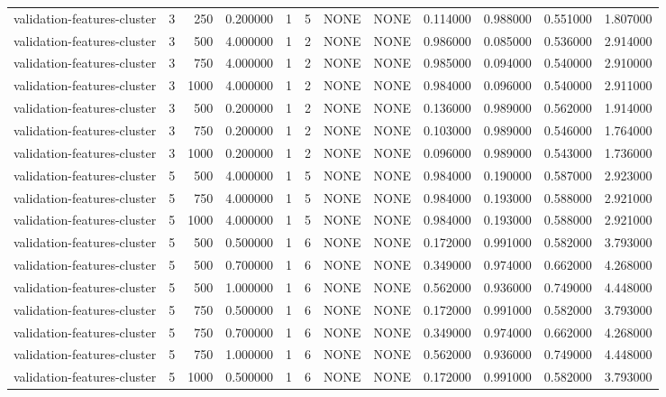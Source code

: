 \begin{tabular}{lrrrllllrrrr}
validation-features-cluster & 3 & 250 & 0.200000 & 1 & 5 & NONE & NONE & 0.114000 & 0.988000 & 0.551000 & 1.807000 \\
validation-features-cluster & 3 & 500 & 4.000000 & 1 & 2 & NONE & NONE & 0.986000 & 0.085000 & 0.536000 & 2.914000 \\
validation-features-cluster & 3 & 750 & 4.000000 & 1 & 2 & NONE & NONE & 0.985000 & 0.094000 & 0.540000 & 2.910000 \\
validation-features-cluster & 3 & 1000 & 4.000000 & 1 & 2 & NONE & NONE & 0.984000 & 0.096000 & 0.540000 & 2.911000 \\
validation-features-cluster & 3 & 500 & 0.200000 & 1 & 2 & NONE & NONE & 0.136000 & 0.989000 & 0.562000 & 1.914000 \\
validation-features-cluster & 3 & 750 & 0.200000 & 1 & 2 & NONE & NONE & 0.103000 & 0.989000 & 0.546000 & 1.764000 \\
validation-features-cluster & 3 & 1000 & 0.200000 & 1 & 2 & NONE & NONE & 0.096000 & 0.989000 & 0.543000 & 1.736000 \\
validation-features-cluster & 5 & 500 & 4.000000 & 1 & 5 & NONE & NONE & 0.984000 & 0.190000 & 0.587000 & 2.923000 \\
validation-features-cluster & 5 & 750 & 4.000000 & 1 & 5 & NONE & NONE & 0.984000 & 0.193000 & 0.588000 & 2.921000 \\
validation-features-cluster & 5 & 1000 & 4.000000 & 1 & 5 & NONE & NONE & 0.984000 & 0.193000 & 0.588000 & 2.921000 \\
validation-features-cluster & 5 & 500 & 0.500000 & 1 & 6 & NONE & NONE & 0.172000 & 0.991000 & 0.582000 & 3.793000 \\
validation-features-cluster & 5 & 500 & 0.700000 & 1 & 6 & NONE & NONE & 0.349000 & 0.974000 & 0.662000 & 4.268000 \\
validation-features-cluster & 5 & 500 & 1.000000 & 1 & 6 & NONE & NONE & 0.562000 & 0.936000 & 0.749000 & 4.448000 \\
validation-features-cluster & 5 & 750 & 0.500000 & 1 & 6 & NONE & NONE & 0.172000 & 0.991000 & 0.582000 & 3.793000 \\
validation-features-cluster & 5 & 750 & 0.700000 & 1 & 6 & NONE & NONE & 0.349000 & 0.974000 & 0.662000 & 4.268000 \\
validation-features-cluster & 5 & 750 & 1.000000 & 1 & 6 & NONE & NONE & 0.562000 & 0.936000 & 0.749000 & 4.448000 \\
validation-features-cluster & 5 & 1000 & 0.500000 & 1 & 6 & NONE & NONE & 0.172000 & 0.991000 & 0.582000 & 3.793000 \\

\end{tabular}
